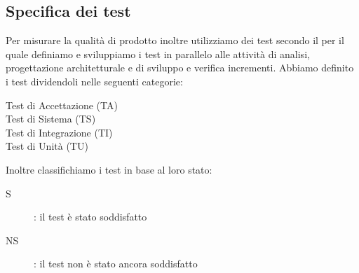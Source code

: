 \documentclass[../piano-di-qualifica.tex]{subfiles}
\begin{document}
\subsection{Specifica dei test}%
\label{sub:test}
    Per misurare la qualità di prodotto inoltre utilizziamo dei test secondo il  per il quale definiamo e sviluppiamo i test in parallelo alle attività di analisi, progettazione architetturale e di sviluppo e verifica incrementi.
    Abbiamo definito i test dividendoli nelle seguenti categorie:
    \begin{description}
      \item [Test di Accettazione (TA)]
      \item [Test di Sistema (TS)]
      \item [Test di Integrazione (TI)]
      \item [Test di Unità (TU)]
    \end{description}
    Inoltre classifichiamo i test in base al loro stato:
      \begin{description}
        \item [S]: il test è stato soddisfatto
        \item [NS]: il test non è stato ancora soddisfatto
      \end{description}
\end{document}
